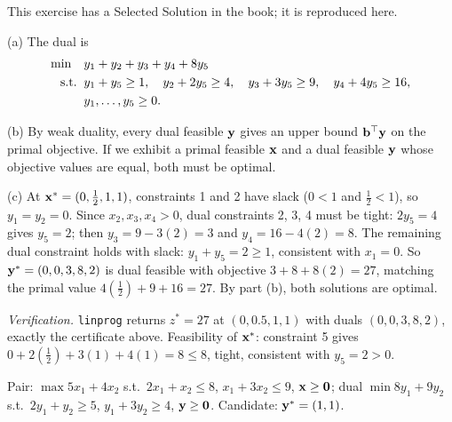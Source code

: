 
This exercise has a Selected Solution in the book; it is reproduced here.

(a) The dual is
\[
\begin{aligned}
\min \quad & y_1 + y_2 + y_3 + y_4 + 8y_5 \\
\text{s.t.}\;\; & y_1 + y_5 \geq 1, \quad y_2 + 2y_5 \geq 4, \quad y_3 + 3y_5 \geq 9, \quad y_4 + 4y_5 \geq 16, \\
& y_1, \dots, y_5 \geq 0.
\end{aligned}
\]

(b) By weak duality, every dual feasible $\mathbf{y}$ gives an upper bound $\mathbf{b}^\top \mathbf{y}$ on the primal objective. If we exhibit a primal feasible $\mathbf{x}$ and a dual feasible $\mathbf{y}$ whose objective values are equal, both must be optimal.

(c) At $\mathbf{x}^* = (0, \tfrac{1}{2}, 1, 1)$, constraints 1 and 2 have slack ($0 < 1$ and $\tfrac12 < 1$), so $y_1 = y_2 = 0$. Since $x_2, x_3, x_4 > 0$, dual constraints 2, 3, 4 must be tight: $2y_5 = 4$ gives $y_5 = 2$; then $y_3 = 9 - 3(2) = 3$ and $y_4 = 16 - 4(2) = 8$. The remaining dual constraint holds with slack: $y_1 + y_5 = 2 \geq 1$, consistent with $x_1 = 0$. So $\mathbf{y}^* = (0, 0, 3, 8, 2)$ is dual feasible with objective $3 + 8 + 8(2) = 27$, matching the primal value $4(\tfrac12) + 9 + 16 = 27$. By part (b), both solutions are optimal.

\emph{Verification.} \texttt{linprog} returns $z^* = 27$ at $(0, 0.5, 1, 1)$ with duals $(0, 0, 3, 8, 2)$, exactly the certificate above. Feasibility of $\mathbf{x}^*$: constraint 5 gives $0 + 2(\tfrac12) + 3(1) + 4(1) = 8 \le 8$, tight, consistent with $y_5 = 2 > 0$.


Pair: $\max 5x_1 + 4x_2$ s.t.\ $2x_1 + x_2 \le 8$, $x_1 + 3x_2 \le 9$, $\mathbf{x} \ge \mathbf{0}$; dual $\min 8y_1 + 9y_2$ s.t.\ $2y_1 + y_2 \ge 5$, $y_1 + 3y_2 \ge 4$, $\mathbf{y} \ge \mathbf{0}$. Candidate: $\mathbf{y}^* = (1, 1)$.

